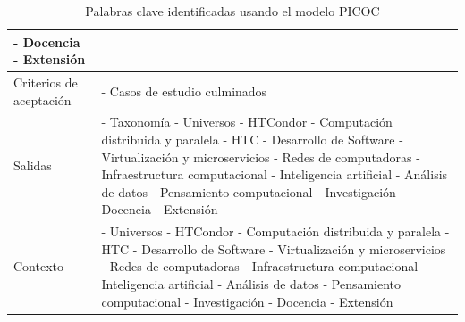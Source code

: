 \begin{table}[H]
\begin{tabular}{|p{3cm}|p{10.0cm}|}
		- Docencia \newline
		- Extensión                                               \\
		\hline
		Criterios de aceptación         &
		- Casos de estudio culminados                             \\
		\hline
		Salidas                         &
		- Taxonomía \newline
		- Universos \newline
		- HTCondor \newline
		- Computación distribuida y paralela \newline
		- HTC \newline
		- Desarrollo de Software \newline
		- Virtualización y microservicios \newline
		- Redes de computadoras \newline
		- Infraestructura computacional \newline
		- Inteligencia artificial \newline
		- Análisis de datos \newline
		- Pensamiento computacional \newline
		- Investigación \newline
		- Docencia \newline
		- Extensión                                               \\
		\hline
		Contexto                        &
		- Universos \newline
		- HTCondor \newline
		- Computación distribuida y paralela \newline
		- HTC \newline
		- Desarrollo de Software \newline
		- Virtualización y microservicios \newline
		- Redes de computadoras \newline
		- Infraestructura computacional \newline
		- Inteligencia artificial \newline
		- Análisis de datos \newline
		- Pensamiento computacional \newline
		- Investigación \newline
		- Docencia \newline
		- Extensión                                               \\
		\hline
	\end{tabular}
	\caption{Palabras clave identificadas usando el modelo PICOC}
	\label{table:keywords-picoc}
\end{table}


